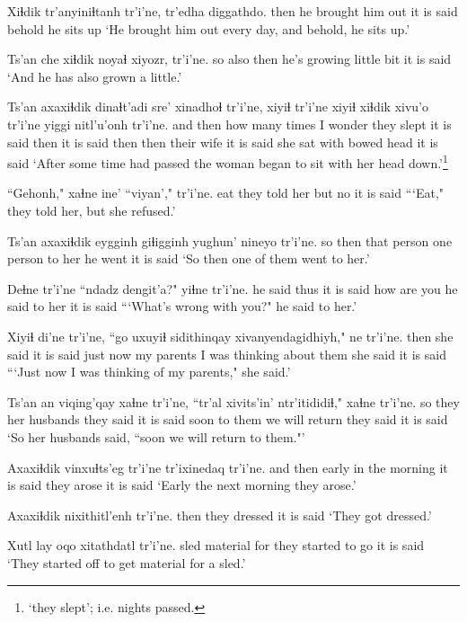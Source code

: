 \documentclass[12pt]{article}
\begin{document}
\gll Xiɬdik tr'anyiniɬtanh tr'i'ne, tr'edha diggathdo.
then {he brought him out} {it is said} behold {he sits up}
\glt `He brought him out every day, and behold, he sits up.'
\glend

\gll Ts'an che xiɬdik  noyaɬ  xiyozr, tr'i'ne.
so also then {he's growing} {little bit} {it is said}
\glt `And he has also grown a little.'
\glend

\gll Ts'an axaxiɬdik dinaɬt'adi  sre'  xinadhoɬ tr'i'ne, xiyiɬ tr'i'ne xiyiɬ xiɬdik xivu'o  tr'i'ne {yiggi nitl'u'onh} tr'i'ne.
and then  {how many times} {I wonder} {they slept} {it is said} then {it is said} then then {their wife} {it is said} {she sat with bowed head} {it is said}
\glt `After some time had passed the woman began to sit with her head down.'\footnote{`they slept'; i.e. nights passed.}
\glend

\gll ``Gehonh," xaɬne  ine' ``viyan'," tr'i'ne.
eat  {they told her} but no  {it is said}
\glt ```Eat," they told her, but she refused.'
\glend

\gll Ts'an axaxiɬdik eygginh giɬigginh yughun' nineyo tr'i'ne.
so then {that person} {one person} {to her} {he went} {it is said}
\glt `So then one of them went to her.'
\glend

\gll Deɬne  tr'i'ne {``ndadz dengit'a?"} yiɬne  tr'i'ne.
{he said thus} {it is said} {how are you} {he said to her} {it is said}
\glt ```What's wrong with you?" he said to her.'
\glend

\gll Xiyiɬ di'ne tr'i'ne, {``go uxuyiɬ} sidithinqay xivanyendagidhiyh," ne  tr'i'ne.
then {she said} {it is said} {just now} {my parents} {I was thinking about them} {she said} {it is said}
\glt ```Just now I was thinking of my parents," she said.'
\glend

\gll Ts'an an viqing'qay xaɬne tr'i'ne, ``tr'al xivits'in' ntr'itididiɬ," xaɬne  tr'i'ne.
so they {her husbands} {they said} {it is said} soon {to them} {we will return} {they said} {it is said}
\glt `So her husbands said, ``soon we will return to them."'
\glend

\gll Axaxiɬdik vinxuɬts'eg tr'i'ne tr'ixinedaq tr'i'ne.
{and then} {early in the morning} {it is said} {they arose} {it is said}
\glt `Early the next morning they arose.'
\glend

\gll Axaxiɬdik nixithitl'enh tr'i'ne.
then {they dressed} {it is said}
\glt `They got dressed.'
\glend

\gll Xutl lay  oqo xitathdatl tr'i'ne.
sled material for {they started to go} {it is said}
\glt `They started off to get material for a sled.'
\glend
\end{document}
